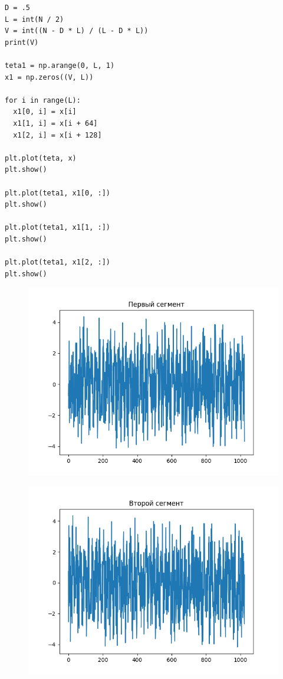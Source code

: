 \documentclass[12pt]{article}
\begin{document}
\begin{lstlisting}
D = .5
L = int(N / 2)
V = int((N - D * L) / (L - D * L))
print(V)

teta1 = np.arange(0, L, 1)
x1 = np.zeros((V, L))

for i in range(L):
  x1[0, i] = x[i]
  x1[1, i] = x[i + 64]
  x1[2, i] = x[i + 128]

plt.plot(teta, x)
plt.show()

plt.plot(teta1, x1[0, :])
plt.show()

plt.plot(teta1, x1[1, :])
plt.show()

plt.plot(teta1, x1[2, :])
plt.show()
\end{lstlisting}



\begin{figure}[!htb]
\centering
\includegraphics[scale=1.00]{first_seg.png}
\caption{}
\label{}
\end{figure}

\begin{figure}[!htb]
\centering
\includegraphics[scale=1.00]{second_seg.png}
\caption{}
\label{}
\end{figure}
\end{document}

